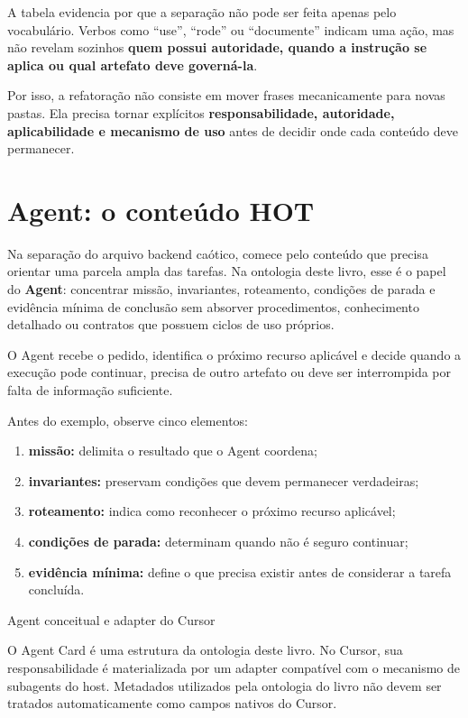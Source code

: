 \documentclass[
  10pt,
  a4paper,
  oneside]{book}
\providecommand{\tightlist}{%
  \setlength{\itemsep}{0pt}\setlength{\parskip}{0pt}}
\begin{document}
A tabela evidencia por que a separação não pode ser feita apenas pelo
vocabulário. Verbos como ``use'', ``rode'' ou ``documente'' indicam uma
ação, mas não revelam sozinhos \textbf{quem possui autoridade, quando a
instrução se aplica ou qual artefato deve governá-la}.

Por isso, a refatoração não consiste em mover frases mecanicamente para
novas pastas. Ela precisa tornar explícitos \textbf{responsabilidade,
autoridade, aplicabilidade e mecanismo de uso} antes de decidir onde
cada conteúdo deve permanecer.

\hypertarget{agent-o-conteuxfado-hot}{%
\section{Agent: o conteúdo HOT}\label{agent-o-conteuxfado-hot}}

Na separação do arquivo backend caótico, comece pelo conteúdo que
precisa orientar uma parcela ampla das tarefas. Na ontologia deste
livro, esse é o papel do \textbf{Agent}: concentrar missão, invariantes,
roteamento, condições de parada e evidência mínima de conclusão sem
absorver procedimentos, conhecimento detalhado ou contratos que possuem
ciclos de uso próprios.

O Agent recebe o pedido, identifica o próximo recurso aplicável e decide
quando a execução pode continuar, precisa de outro artefato ou deve ser
interrompida por falta de informação suficiente.

Antes do exemplo, observe cinco elementos:

\begin{enumerate}
\def\labelenumi{\arabic{enumi}.}
\tightlist
\item
  \textbf{missão:} delimita o resultado que o Agent coordena;
\item
  \textbf{invariantes:} preservam condições que devem permanecer
  verdadeiras;
\item
  \textbf{roteamento:} indica como reconhecer o próximo recurso
  aplicável;
\item
  \textbf{condições de parada:} determinam quando não é seguro
  continuar;
\item
  \textbf{evidência mínima:} define o que precisa existir antes de
  considerar a tarefa concluída.
\end{enumerate}

\begin{infobox}{Agent conceitual e adapter do Cursor}

O Agent Card é uma estrutura da ontologia deste livro. No Cursor, sua
responsabilidade é materializada por um adapter compatível com o
mecanismo de subagents do host. Metadados utilizados pela ontologia do
livro não devem ser tratados automaticamente como campos nativos do
Cursor.

\end{infobox}
\end{document}
